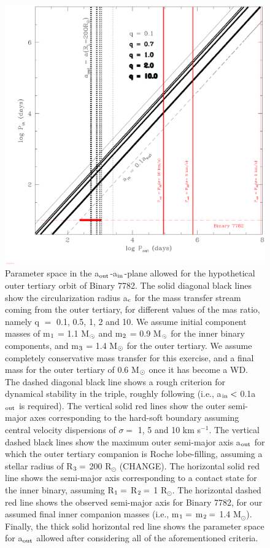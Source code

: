 \documentclass[useAMS,usenatbib]{mnras}
\begin{document}
\begin{figure}
\begin{center}
\includegraphics[width=\columnwidth]{fig1.eps}
\end{center}
\caption[Parameter space in the a$_{\rm out}$-a$_{\rm in}$-plane allowed for the hypothetical outer tertiary orbit of Binary 7782.]{Parameter space in the a$_{\rm out}$-a$_{\rm in}$-plane allowed for the hypothetical outer tertiary orbit of Binary 7782.  The solid diagonal black lines show the circularization radius a$_{\rm c}$ for the mass transfer stream coming from the outer tertiary, for different values of the mas ratio, namely q $=$ 0.1, 0.5, 1, 2 and 10.  We assume initial component masses of m$_{\rm 1}$ = 1.1 M$_{\rm \odot}$ and m$_{\rm 2}$ = 0.9 M$_{\rm \odot}$ for the inner binary components, and m$_{\rm 3}$ = 1.4 M$_{\rm \odot}$ for the outer tertiary.  We assume completely conservative mass transfer for this exercise, and a final mass for the outer tertiary of 0.6 M$_{\rm \odot}$ once it has become a WD.  The dashed diagonal black line shows a rough criterion for dynamical stability in the triple, roughly following \citet{mardling99} (i.e., a$_{\rm in} <$ 0.1a$_{\rm out}$ is required).  The vertical solid red lines show the outer semi-major axes corresponding to the hard-soft boundary assuming central velocity dispersions of $\sigma =$ 1, 5 and 10 km s$^{-1}$.  The vertical dashed black lines show the maximum outer semi-major axis a$_{\rm out}$ for which the outer tertiary companion is Roche lobe-filling, assuming a stellar radius of R$_{\rm 3} =$ 200 R$_{\odot}$ (CHANGE).  The horizontal solid red line shows the semi-major axis corresponding to a contact state for the inner binary, assuming R$_{\rm 1} =$ R$_{\rm 2} =$ 1 R$_{\odot}$.  The horizontal dashed red line shows the observed semi-major axis for Binary 7782, for our assumed final inner companion masses (i.e., m$_{\rm 1} =$ m$_{\rm 2} =$ 1.4 M$_{\odot}$).  Finally, the thick solid horizontal red line shows the parameter space for a$_{\rm out}$ allowed after considering all of the aforementioned criteria.
}
\end{figure}
\end{document}
